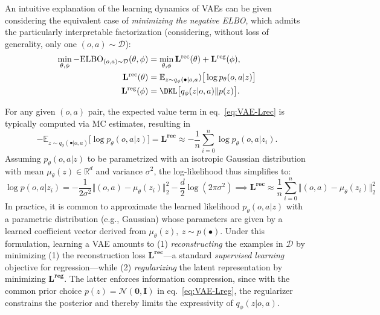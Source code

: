 An intuitive explanation of the learning dynamics of VAEs can be given considering the equivalent case of \emph{minimizing the negative ELBO}, which admits the particularly interpretable factorization (considering, without loss of generality, only one \( (o,a) \sim \mathcal D \)):
\begin{align}
\min_{\theta, \phi} - \text{ELBO}_{\mathcal (o,a) \sim \mathcal D}(\theta, \phi) &= \min_{\theta, \phi}\mathbf{L^{\text{rec}}}(\theta) + \mathbf{L^{\text{reg}}}(\phi), \label{eq:VAE-min-neg-ELBO}\\
\mathbf{L^{\text{rec}}}(\theta) &= \mathbb{E}_{z \sim q_\phi(\bullet \vert o,a}) \big[ \log p_\theta(o,a \vert z) \big] \label{eq:VAE-Lrec} \\
\mathbf{L^{\text{reg}}}(\phi) &= \DKL \big[ q_\phi(z \vert o,a) \Vert p(z) \big]. \label{eq:VAE-Lreg}
\end{align}

For any given \((o,a) \) pair, the expected value term in eq.~\ref{eq:VAE-Lrec} is typically computed via MC estimates, resulting in
\[ 
-\mathbb{E}_{z \sim q_\phi(\bullet \vert o,a)} \big[ \log p_\theta(o,a \vert z) \big] = \mathbf{L^{\text{rec}}} \approx - \frac{1}{n} \sum_{i=0}^n \log p_\theta(o,a \vert z_i).
\]
Assuming \( p_\theta(o,a \vert z) \) to be parametrized with an isotropic Gaussian distribution with mean \(\mu_\theta (z) \in \mathbb R^d \) and variance \( \sigma^2 \), the log-likelihood thus simplifies to:
\[
\log p(o,a \vert z_i) = -\frac{1}{2\sigma^{2}} \big \Vert (o,a)-\mu_\theta(z_i) \big\Vert_2^2 -\frac{d}{2}\log(2\pi \sigma^{2}) \implies \mathbf{L^\text{rec}} \approx \frac {1}{n} \sum_{i=0}^n \big\Vert (o,a) - \mu_\theta(z_i) \big \Vert^2_2
\]
In practice, it is common to approximate the learned likelihood \( p_\theta(o,a \vert z) \) with a parametric distribution (e.g., Gaussian) whose parameters are given by a learned coefficient vector derived from \( \mu_\theta(z), \ z \sim p(\bullet) \). 
Under this formulation, learning a VAE amounts to (1) \emph{reconstructing} the examples in \( \mathcal{D} \) by minimizing (1) the reconstruction loss \( \mathbf{L^{\text{rec}}}\)---a standard \emph{supervised learning} objective for regression---while (2) \emph{regularizing} the latent representation by minimizing \( \mathbf{L^{\text{reg}}} \). 
The latter enforces information compression, since with the common prior choice \( p(z) = \mathcal{N}(\mathbf{0}, \mathbf{I})\) in eq.~\ref{eq:VAE-Lreg}, the regularizer constrains the posterior and thereby limits the expressivity of \( q_\phi(z \vert o,a) \).

